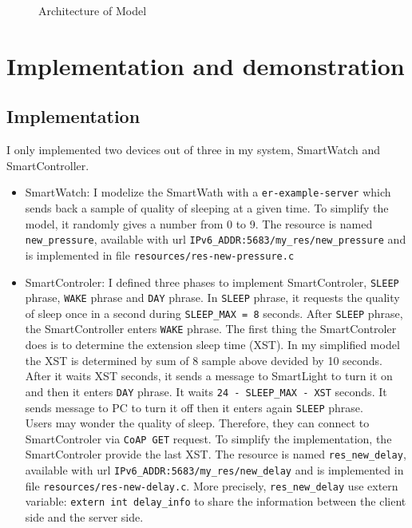 \documentclass[a4paper]{article}
\begin{document}
\begin{figure}[h]
\begin{tikzpicture}[x=0.75pt,y=0.75pt,yscale=-1,xscale=1]
\end{tikzpicture}
\caption{Architecture of Model}
\label{fig:architecture}

\end{figure}

\section{Implementation and demonstration}

\subsection{Implementation}
I only implemented two devices out of three in my system, SmartWatch and
SmartController. 

\begin{itemize}
    \item SmartWatch: I modelize the SmartWath with a
        \texttt{er-example-server} which sends back a sample of quality of
        sleeping at a given time. To simplify the model, it randomly gives a
        number from 0 to 9. The resource is named \texttt{new\_pressure},
        available with url \texttt{IPv6\_ADDR:5683/my\_res/new\_pressure} and is
        implemented in file \texttt{resources/res-new-pressure.c}
    \item SmartControler: I defined three phases to implement 
        SmartControler, \texttt{SLEEP} phrase, \texttt{WAKE} phrase and
        \texttt{DAY} phrase. In \texttt{SLEEP} phrase, it requests the quality
        of sleep once in a second during \texttt{SLEEP\_MAX = 8} seconds. After
        \texttt{SLEEP} phrase, the SmartController enters \texttt{WAKE} phrase.
        The first thing the SmartControler does is to determine the extension
        sleep time (XST). In my simplified model the XST is determined by sum of 8
        sample above devided by 10 seconds. After it waits XST seconds, it sends
        a message to SmartLight to turn it on and then it enters \texttt{DAY}
        phrase. It waits \texttt{24 - SLEEP\_MAX - XST} seconds. It sends message
        to PC to turn it off then it enters again \texttt{SLEEP} phrase.\\
        Users may wonder the quality of sleep. Therefore, they can connect to
        SmartControler via \texttt{CoAP GET} request. To simplify the
        implementation, the SmartControler provide the last XST. The resource is
        named \texttt{res\_new\_delay}, available with url
        \texttt{IPv6\_ADDR:5683/my\_res/new\_delay} and is implemented in file
        \texttt{resources/res-new-delay.c}. More precisely,
        \texttt{res\_new\_delay} use extern variable: \texttt{extern int
        delay\_info} to share the information between the client side and the
        server side.
\end{itemize}
\end{document}
